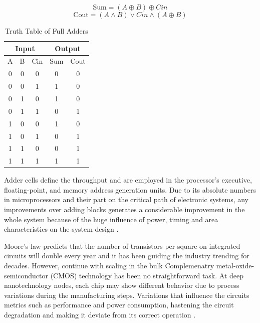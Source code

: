 \documentclass[ecp,tc, english]{iiufrgs}
\newcommand*\xor{\mathbin{\oplus}}
\begin{document}
\begin{equation}
\label{eqn:01}
\text{Sum} = (A \xor{} B) \xor{} Cin
\end{equation}
\begin{equation}
\label{eqn:02}
\text{Cout} = (A \wedge B) \vee Cin \wedge (A \xor{} B)
\end{equation}

\begin{table}[H]
\centering
\caption{Truth Table of Full Adders}
\label{tab:01}
\begin{tabular}{|c|c|c|c|c|}
\hline
\multicolumn{3}{|c|}{Input} & \multicolumn{2}{c|}{Output} \\ \hline
A       & B      & Cin      & Sum          & Cout         \\ \hline
0       & 0      & 0        & 0            & 0            \\ \hline
0       & 0      & 1        & 1            & 0            \\ \hline
0       & 1      & 0        & 1            & 0            \\ \hline
0       & 1      & 1        & 0            & 1            \\ \hline
1       & 0      & 0        & 1            & 0            \\ \hline
1       & 0      & 1        & 0            & 1            \\ \hline
1       & 1      & 0        & 0            & 1            \\ \hline
1       & 1      & 1        & 1            & 1            \\ \hline
\end{tabular}
\end{table}

Adder cells define the throughput and are employed in the processor’s executive, floating-point, and memory address generation units. Due to its absolute numbers in microprocessors and their part on the critical path of electronic systems, any improvements over adding blocks generates a considerable improvement in the whole system because of the huge influence of power, timing and area characteristics on the system design \cite{shoarinejad:03}.

Moore’s law predicts that the number of transistors per square on integrated circuits will double every year and it has been guiding the industry trending for decades. However, continue with scaling in the bulk Complemenatry metal-oxide-semiconductor (CMOS) technology has been no straightforward task. At deep nanotechnology nodes, each chip may show different behavior due to process variations during the manufacturing steps. Variations that influence the circuits metrics such as performance and power consumption, hastening the circuit degradation and making it deviate from its correct operation \cite{abbas:15} \cite{nassif:08}. 
\end{document}

